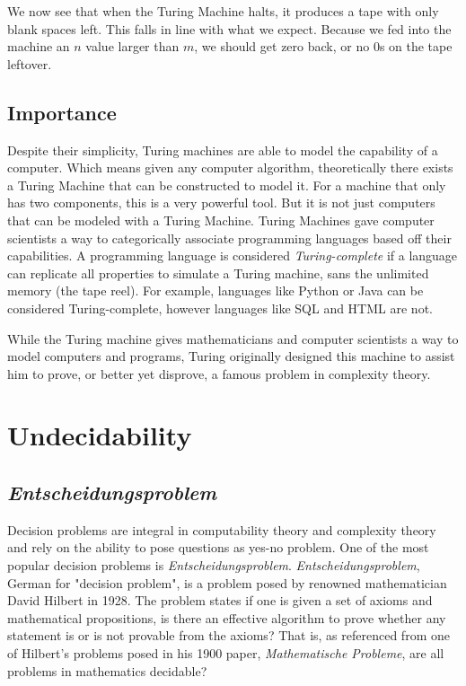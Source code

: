 \documentclass[12pt]{article}
\begin{document}
\noindent We now see that when the Turing Machine halts, it produces a tape with only blank spaces left. This falls in line with what we expect. Because we fed into the machine an $n$ value larger than $m$, we should get zero back, or no $0$s on the tape leftover.


\subsection{Importance}

Despite their simplicity, Turing machines are able to model the capability of a computer. Which means given any computer algorithm, theoretically there exists a Turing Machine that can be constructed to model it. For a machine that only has two components, this is a very powerful tool. But it is not just computers that can be modeled with a Turing Machine. Turing Machines gave computer scientists a way to categorically associate programming languages based off their capabilities. A programming language is considered \textit{Turing-complete} if a language can replicate all properties to simulate a Turing machine, sans the unlimited memory (the tape reel). For example, languages like Python or Java can be considered Turing-complete, however languages like SQL and HTML are not.

While the Turing machine gives mathematicians and computer scientists a way to model computers and programs, Turing originally designed this machine to assist him to prove, or better yet disprove, a famous problem in complexity theory.


\section{Undecidability}

\subsection{\textit{Entscheidungsproblem}}

Decision problems are integral in computability theory and complexity theory and rely on the ability to pose questions as yes-no problem. One of the most popular decision problems is \textit{Entscheidungsproblem}. \textit{Entscheidungsproblem}, German for "decision problem", is a problem posed by renowned mathematician David Hilbert in 1928. The problem states if one is given a set of axioms and mathematical propositions, is there an effective algorithm to prove whether any statement is or is not provable from the axioms? That is, as referenced from one of Hilbert's problems posed in his 1900 paper, \textit{Mathematische Probleme}, are all problems in mathematics decidable?
\end{document}
